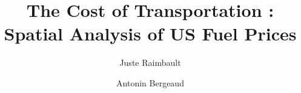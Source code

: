 \documentclass[3p,times,procedia]{elsarticle}
\begin{document}
\begin{frontmatter}




\title{The Cost of Transportation : Spatial Analysis of US Fuel Prices}




\author[a,b]{Juste Raimbault}
\author[d]{Antonin Bergeaud}

\address[a]{UMR CNRS 8504 G{\'e}ographie-cit{\'e}s, 13 rue du Four, Paris, France}
\address[b]{UMR-T IFSTTAR 9403 LVMT, Cit{\'e} Descartes, Champs-sur-Marne, France}
\address[d]{Paris School of Economics - EHESS, Paris, France}



\end{frontmatter}
\end{document}
